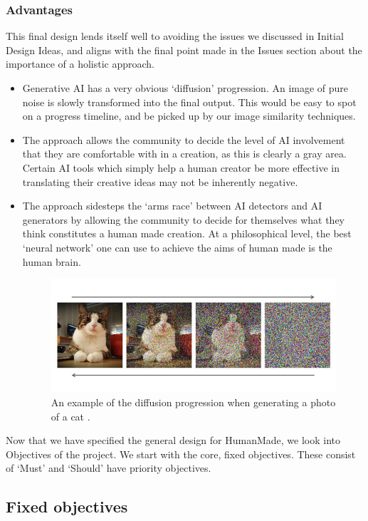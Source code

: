 \documentclass[12pt,a4paper]{article}
\begin{document}
\subsubsection{Advantages}
This final design lends itself well to avoiding the issues we discussed in Initial Design Ideas, and aligns with the final point made in the Issues section about the importance of a holistic approach.
\begin{itemize}
    \item Generative AI has a very obvious `diffusion' progression. An image of pure noise is slowly transformed into the final output. This would be easy to spot on a progress timeline, and be picked up by our image similarity techniques.
    \item The approach allows the community to decide the level of AI involvement that they are comfortable with in a creation, as this is clearly a gray area. Certain AI tools which simply help a human creator be more effective in translating their creative ideas may not be inherently negative.
    \item The approach sidesteps the `arms race' between AI detectors and AI generators by allowing the community to decide for themselves what they think constitutes a human made creation. At a philosophical level, the best `neural network' one can use to achieve the aims of human made is the human brain.
    \begin{figure}[H]
        \centering
        \includegraphics[scale=0.3]{catDiffusion.jpg}
        \caption{An example of the diffusion progression when generating a photo of a cat \cite{cat}.}
    \end{figure}
\end{itemize}




\noindent Now that we have specified the general design for HumanMade, we look into Objectives of the project. We start with the core, fixed objectives. These consist of `Must' and `Should' have priority objectives.
\subsection{Fixed objectives}
\end{document}
